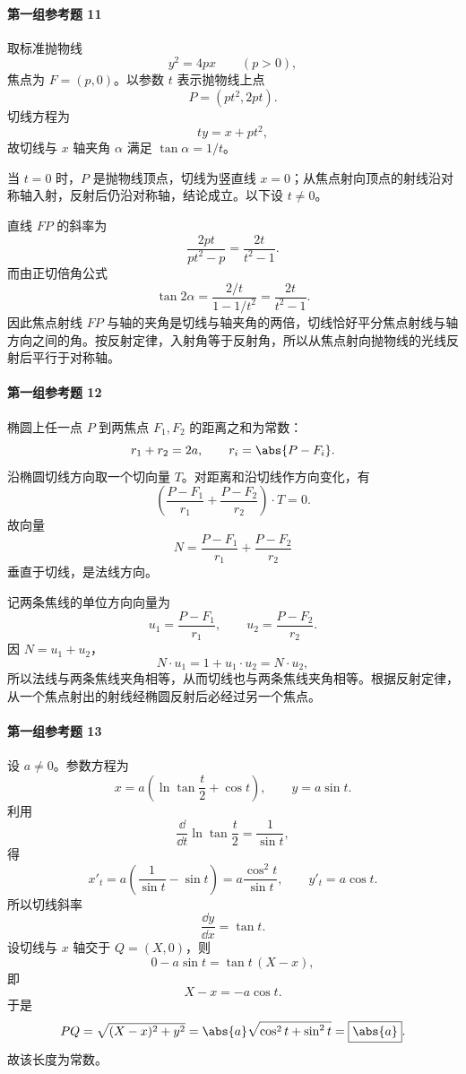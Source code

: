 \paragraph{第一组参考题 11}
\begin{xsolution}
取标准抛物线
\[
  y^2=4px\qquad(p>0),
\]
焦点为 $F=(p,0)$。以参数 $t$ 表示抛物线上点
\[
  P=(pt^2,2pt).
\]
切线方程为
\[
  ty=x+pt^2,
\]
故切线与 $x$ 轴夹角 $\alpha$ 满足 $\tan\alpha=1/t$。

当 $t=0$ 时，$P$ 是抛物线顶点，切线为竖直线 $x=0$；从焦点射向顶点的射线沿对称轴入射，反射后仍沿对称轴，结论成立。以下设 $t\ne0$。

直线 $FP$ 的斜率为
\[
  \frac{2pt}{pt^2-p}=\frac{2t}{t^2-1}.
\]
而由正切倍角公式
\[
  \tan2\alpha=\frac{2/t}{1-1/t^2}=\frac{2t}{t^2-1}.
\]
因此焦点射线 $FP$ 与轴的夹角是切线与轴夹角的两倍，切线恰好平分焦点射线与轴方向之间的角。按反射定律，入射角等于反射角，所以从焦点射向抛物线的光线反射后平行于对称轴。
\end{xsolution}

\paragraph{第一组参考题 12}
\begin{xsolution}
椭圆上任一点 $P$ 到两焦点 $F_1,F_2$ 的距离之和为常数：
\[
  r_1+r_2=2a,
  \qquad r_i=\abs{P-F_i}.
\]
沿椭圆切线方向取一个切向量 $T$。对距离和沿切线作方向变化，有
\[
  \left(\frac{P-F_1}{r_1}+\frac{P-F_2}{r_2}\right)\cdot T=0.
\]
故向量
\[
  N=\frac{P-F_1}{r_1}+\frac{P-F_2}{r_2}
\]
垂直于切线，是法线方向。

记两条焦线的单位方向向量为
\[
  u_1=\frac{P-F_1}{r_1},\qquad u_2=\frac{P-F_2}{r_2}.
\]
因 $N=u_1+u_2$，
\[
  N\cdot u_1=1+u_1\cdot u_2=N\cdot u_2,
\]
所以法线与两条焦线夹角相等，从而切线也与两条焦线夹角相等。根据反射定律，从一个焦点射出的射线经椭圆反射后必经过另一个焦点。
\end{xsolution}

\paragraph{第一组参考题 13}
\begin{xsolution}
设 $a\ne0$。参数方程为
\[
  x=a\left(\ln\tan\frac t2+\cos t\right),
  \qquad y=a\sin t.
\]
利用
\[
  \frac{\dd}{\dd t}\ln\tan\frac t2=\frac1{\sin t},
\]
得
\[
  x'_t=a\left(\frac1{\sin t}-\sin t\right)
  =a\frac{\cos^2t}{\sin t},
  \qquad
  y'_t=a\cos t.
\]
所以切线斜率
\[
  \frac{\dd y}{\dd x}=\tan t.
\]
设切线与 $x$ 轴交于 $Q=(X,0)$，则
\[
  0-a\sin t=\tan t\,(X-x),
\]
即
\[
  X-x=-a\cos t.
\]
于是
\[
  PQ=\sqrt{(X-x)^2+y^2}
  =\abs{a}\sqrt{\cos^2t+\sin^2t}
  =\boxed{\abs{a}}.
\]
故该长度为常数。
\end{xsolution}

